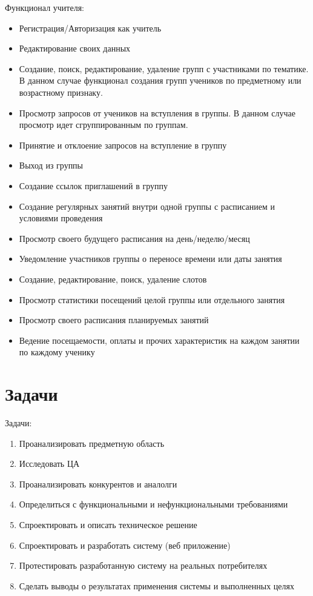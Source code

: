 \documentclass[14pt, timesnewroman]{article}
\begin{document}
Функционал учителя:
\begin{itemize}
    \item  Регистрация/Авторизация как учитель
    \item  Редактирование своих данных
    \item  Создание, поиск, редактирование, удаление групп с участниками по тематике. В данном случае функционал создания групп учеников по предметному или возрастному признаку. 
    \item  Просмотр запросов от учеников на вступления в группы. В данном случае просмотр идет сгруппированным по группам.
    \item  Принятие и отклоение запросов на вступление в группу
    \item  Выход из группы
    \item  Создание ссылок приглашений в группу
    \item  Создание регулярных занятий внутри одной группы с расписанием и условиями проведения
    \item  Просмотр своего будущего расписания на день/неделю/месяц
    \item  Уведомление участников группы о переносе времени или даты занятия
    \item  Создание, редактирование, поиск, удаление слотов
    \item  Просмотр статистики посещений целой группы или отдельного занятия
    \item  Просмотр своего расписания планируемых занятий
    \item  Ведение посещаемости, оплаты и прочих характеристик на каждом занятии по каждому ученику
\end{itemize}

\section{Задачи}


Задачи:
\begin{enumerate}
    \item Проанализировать предметную область
    \item Исследовать ЦА
    \item Проанализировать конкурентов и аналолги
    \item Определиться с функциональными и нефункциональными требованиями
    \item Спроектировать и описать техническое решение
    \item Спроектировать и разработать систему (веб приложение)
    \item Протестировать разработанную систему на реальных потребителях
    \item Сделать выводы о результатах применения системы и выполненных целях
\end{enumerate}
\end{document}
